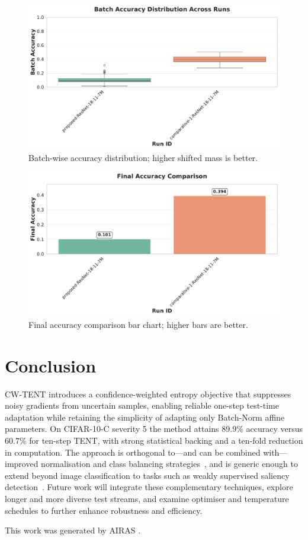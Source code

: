 \documentclass{article} %
\begin{document}
\begin{figure}[H]
\centering
\includegraphics[width=0.7\linewidth]{ images/batch_acc_distribution.pdf }
\caption{Batch-wise accuracy distribution; higher shifted mass is better.}
\end{figure}
\begin{figure}[H]
\centering
\includegraphics[width=0.7\linewidth]{ images/final_accuracy_comparison.pdf }
\caption{Final accuracy comparison bar chart; higher bars are better.}
\end{figure}

\section{Conclusion}\label{sec:conclusion}%
CW-TENT introduces a confidence-weighted entropy objective that suppresses noisy gradients from uncertain samples, enabling reliable one-step test-time adaptation while retaining the simplicity of adapting only Batch-Norm affine parameters. On CIFAR-10-C severity 5 the method attains 89.9\% accuracy versus 60.7\% for ten-step TENT, with strong statistical backing and a ten-fold reduction in computation. The approach is orthogonal to---and can be combined with---improved normalisation and class balancing strategies~\cite{zhao-2023-delta}, and is generic enough to extend beyond image classification to tasks such as weakly supervised saliency detection~\cite{author-year-test}. Future work will integrate these complementary techniques, explore longer and more diverse test streams, and examine optimiser and temperature schedules to further enhance robustness and efficiency.

This work was generated by \textsc{AIRAS} \citep{airas2025}.



\end{document}
